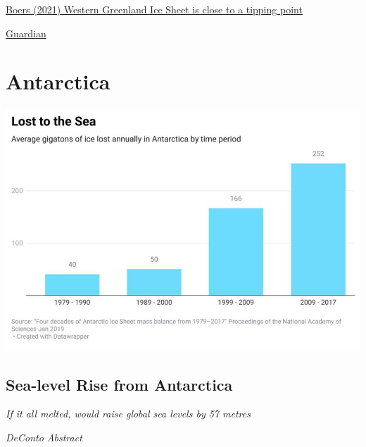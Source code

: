 \documentclass[
]{book}
\begin{document}
\href{https://www.pnas.org/content/118/21/e2024192118}{Boers (2021) Western Greenland Ice Sheet is close to a tipping point}

\href{https://www.theguardian.com/environment/2021/may/17/greenland-ice-sheet-on-brink-of-major-tipping-point-says-study}{Guardian}

\hypertarget{antarctica}{%
\section{Antarctica}\label{antarctica}}

\includegraphics{fig/Antarctica_Ice_Loss_to_Sea.jpeg}

\hypertarget{sea-level-rise-from-antarctica}{%
\subsection{Sea-level Rise from Antarctica}\label{sea-level-rise-from-antarctica}}

\emph{If it all melted, would raise global sea levels by 57 metres}

\emph{DeConto Abstract}
\end{document}
